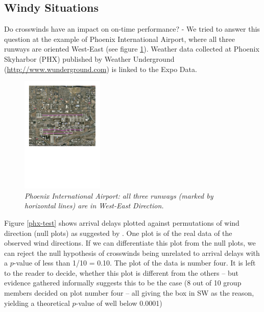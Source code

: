 \documentclass[11pt]{article}
\begin{document}
\subsection{Windy Situations}
Do crosswinds have an impact on on-time performance? - We tried to answer this question at the example of Phoenix International Airport, where all three runways are oriented West-East (see figure \ref{phx}). Weather data collected at Phoenix Skyharbor (PHX) published  by Weather Underground (\url{http://www.wunderground.com}) is linked to the Expo Data. 

\begin{figure}
\vspace{-25pt}
  \begin{center}
    \includegraphics[width=0.35\textwidth]{PHX-airport}
  \end{center}
\vspace{-20pt}
   \caption{\it Phoenix International Airport: all three runways (marked by horizontal lines) are in West-East Direction.}
\vspace{-10pt}
   \label{phx}
\end{figure}

Figure \ref{phx-test} shows arrival delays plotted against permutations  of wind direction (null plots) as suggested by \cite{buja:2009}. 
%
One plot is of the real data of the observed wind directions. If we can differentiate this plot from  the null plots, we can reject the null hypothesis of crosswinds being unrelated to arrival delays with a $p$-value of less than 1/10 = 0.10. The plot of the data is number four. It is left to the reader to decide, whether this plot is different from the others -- but evidence gathered informally suggests this to be the case (8 out of 10 group members decided on plot number four -- all giving the box in SW as the reason, yielding a theoretical $p$-value of  well below 0.0001)
\end{document}
